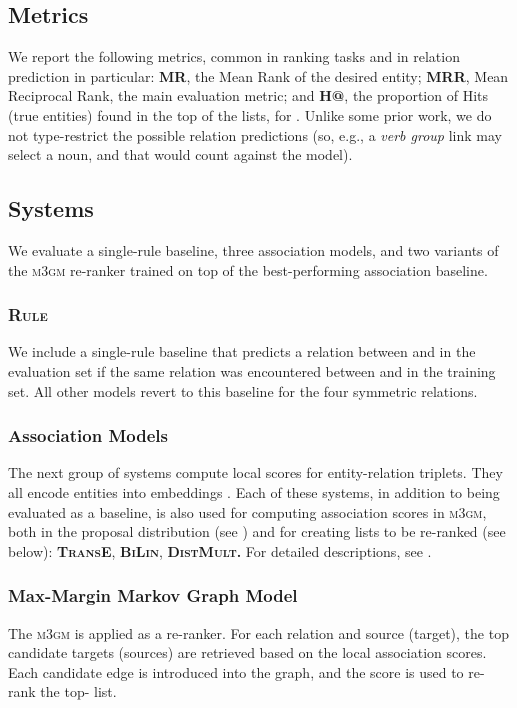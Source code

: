 \documentclass[11pt,twocolumn]{article}
\newcommand{\sysname}[0]{\textsc{m3gm}}
\begin{document}
\subsection{Metrics}
We report the following metrics, common in ranking tasks and in relation prediction in particular:
\textbf{MR}, the Mean Rank of the desired entity;
\textbf{MRR}, Mean Reciprocal Rank, the main evaluation metric;
and \textbf{H@}, the proportion of Hits (true entities) found in the top  of the lists, for .
Unlike some prior work, we do not type-restrict the possible relation predictions (so, e.g., a \textit{verb group} link may select a noun, and that would count against the model).


\subsection{Systems}

We evaluate a single-rule baseline, three association models, and two variants of the \sysname{} re-ranker trained on top of the best-performing association baseline.

\subsubsection{\textsc{Rule}} We include a single-rule baseline that predicts a relation between  and  in the evaluation set if the same relation was encountered between  and  in the training set.
All other models revert to this baseline for the four symmetric relations.

\subsubsection{Association Models}
The next group of systems compute local scores for entity-relation triplets.
They all encode entities into embeddings .
Each of these systems, in addition to being evaluated as a baseline, is also used for computing association scores in \sysname{}, both in the proposal distribution (see ) and for creating lists to be re-ranked (see below): \textbf{\textsc{TransE}}, \textbf{\textsc{BiLin}}, \textbf{\textsc{DistMult}.}
For detailed descriptions, see .

\subsubsection{Max-Margin Markov Graph Model}
The \sysname{} is applied as a re-ranker.
For each relation and source (target), the top  candidate targets (sources) are retrieved based on the local association scores.
Each candidate edge is introduced into the graph, and the score  is used to re-rank the top- list.
\end{document}
